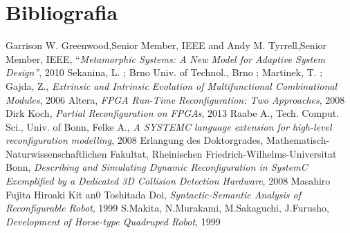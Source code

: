\documentclass[a4paper,titlepage]{book}
\begin{document}
\chapter{Bibliografia}

\begin{thebibliography}{1}
 Garrison W. Greenwood,Senior Member, IEEE and Andy M. Tyrrell,Senior Member, IEEE, ``\textit{Metamorphic Systems: A New Model for Adaptive System Design''}, 2010
 Sekanina, L. ; Brno Univ. of Technol., Brno ; Martinek, T. ; Gajda, Z., \textit{Extrinsic and Intrinsic Evolution of Multifunctional Combinational Modules}, 2006
 Altera, \textit{FPGA Run-Time Reconfiguration: Two Approaches}, 2008
 Dirk Koch, \textit{Partial Reconfiguration on FPGAs}, 2013
 Raabe A., Tech. Comput. Sci., Univ. of Bonn, Felke A., \textit{A SYSTEMC language extension for high-level reconfiguration modelling}, 2008
 Erlangung des Doktorgrades, Mathematisch-Naturwissenschaftlichen Fakultat, Rheinischen Friedrich-Wilhelms-Universitat Bonn, \textit{Describing and Simulating Dynamic Reconfiguration in SystemC Exemplified by a Dedicated 3D Collision Detection Hardware}, 2008
 Masahiro Fujita Hiroaki Kit an0 Toshitada Doi, \textit{Syntactic-Semantic Analysis of Reconfigurable Robot}, 1999
 S.Makita, N.Murakami, M.Sakaguchi, J.Furusho, \textit{Development of Horse-type Quadruped Robot}, 1999
\end{thebibliography}
\end{document}
